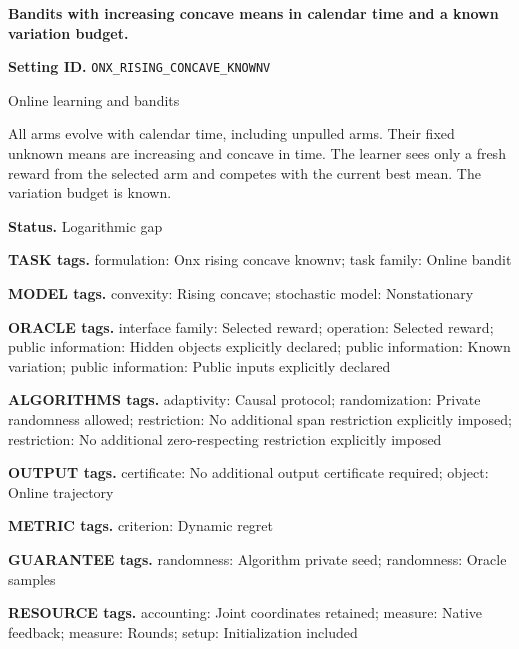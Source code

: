 \documentclass[10pt,a4paper]{article}
\begin{document}
\raggedright

{\LARGE\bfseries\sffamily\color{AtlasNavy} Bandits with increasing concave means in calendar time and a known variation budget.\par}\vspace{5pt}


\textbf{Setting ID.} \texttt{ONX\_\allowbreak{}RISING\_\allowbreak{}CONCAVE\_\allowbreak{}KNOWNV}



Online learning and bandits



All arms evolve with calendar time, including unpulled arms. Their fixed unknown means are increasing and concave in time. The learner sees only a fresh reward from the selected arm and competes with the current best mean. The variation budget is known.



\textbf{Status.} Logarithmic gap



\textbf{TASK tags.} formulation: Onx rising concave knownv; task family: Online bandit



\textbf{MODEL tags.} convexity: Rising concave; stochastic model: Nonstationary



\textbf{ORACLE tags.} interface family: Selected reward; operation: Selected reward; public information: Hidden objects explicitly declared; public information: Known variation; public information: Public inputs explicitly declared



\textbf{ALGORITHMS tags.} adaptivity: Causal protocol; randomization: Private randomness allowed; restriction: No additional span restriction explicitly imposed; restriction: No additional zero-respecting restriction explicitly imposed



\textbf{OUTPUT tags.} certificate: No additional output certificate required; object: Online trajectory



\textbf{METRIC tags.} criterion: Dynamic regret



\textbf{GUARANTEE tags.} randomness: Algorithm private seed; randomness: Oracle samples



\textbf{RESOURCE tags.} accounting: Joint coordinates retained; measure: Native feedback; measure: Rounds; setup: Initialization included
\end{document}
